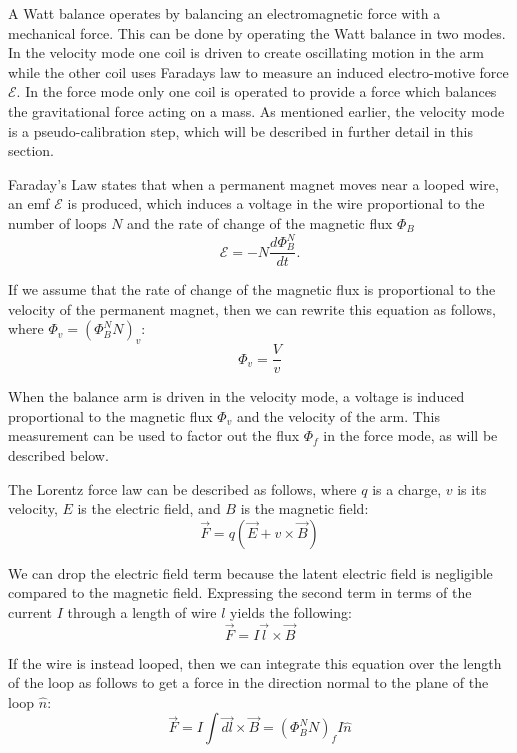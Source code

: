 \documentclass[aps,prstab,reprint,12pt]{revtex4-1}
\begin{document}
A Watt balance operates by balancing an electromagnetic force with a mechanical force. This can be done by operating the Watt balance in two modes. In the velocity mode one coil is driven to create oscillating motion in the arm while the other coil uses Faradays law to measure an induced electro-motive force $\mathscr{E}$. In the force mode only one coil is operated to provide a force which balances the gravitational force acting on a mass. As mentioned earlier, the velocity mode is a pseudo-calibration step, which will be described in further detail in this section.

Faraday's Law states that when a permanent magnet moves near a looped wire, an emf $\mathscr{E}$ is produced, which induces a voltage in the wire proportional to the number of loops $N$ and the rate of change of the magnetic flux $\Phi_B$
\begin{equation}\label{eq:Faraday}
\mathscr{E} =-N\frac{d \Phi_B^N}{dt}.
\end{equation}

If we assume that the rate of change of the magnetic flux is proportional to the velocity of the permanent magnet, then we can rewrite this equation as follows, where $\Phi_v = (\Phi_B^NN)_v$:
\begin{equation}\label{eq:velocity_equation}
    \Phi_v  = \frac{V}{v}
\end{equation}

When the balance arm is driven in the velocity mode, a voltage is induced proportional to the magnetic flux $\Phi_v$ and the velocity of the arm. This measurement can be used to factor out the flux $\Phi_f$ in the force mode, as will be described below.

The Lorentz force law can be described as follows, where $q$ is a charge, $v$ is its velocity, $E$ is the electric field, and $B$ is the magnetic field:
\begin{equation}
    \vec{F} = q(\vec{E}+v\times \vec{B})
\end{equation}

We can drop the electric field term because the latent electric field is negligible compared to the magnetic field. Expressing the second term in terms of the current $I$ through a length of wire $l$ yields the following:
\begin{equation}
    \vec{F} = I \vec{l}\times \vec{B}
\end{equation}

If the wire is instead looped, then we can integrate this equation over the length of the loop as follows to get a force in the direction normal to the plane of the loop $\hat{n}$:
\begin{equation}
    \vec{F} = I\int\vec{dl}\times\vec{B}  = (\Phi_B^N N)_fI \hat{n}
\end{equation}
\end{document}
